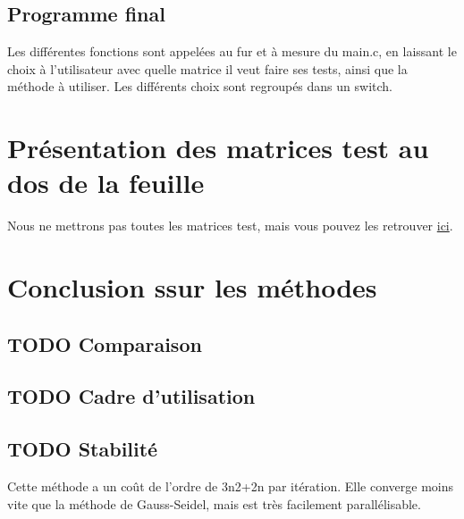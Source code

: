 \documentclass[letter]{article}
\begin{document}
\subsection{Programme final}
\label{sec:org2ace575}

Les différentes fonctions sont appelées au fur et à mesure du main.c, en laissant le choix à l'utilisateur avec quelle matrice il veut faire ses tests, ainsi que la méthode à utiliser. Les différents choix sont regroupés dans un switch.



\section{Présentation des matrices test au dos de la feuille}
\label{sec:org2186ad6}

Nous ne mettrons pas toutes les matrices test, mais vous pouvez les retrouver \href{matricetest.c}{ici}.





\section{Conclusion ssur les méthodes}
\label{sec:orgda48e3e}

\subsection{{\bfseries\sffamily TODO} Comparaison}
\label{sec:orga1fc223}

\subsection{{\bfseries\sffamily TODO} Cadre d'utilisation}
\label{sec:org5338251}

\subsection{{\bfseries\sffamily TODO} Stabilité}
\label{sec:orge2a490a}
Cette méthode a un coût de l'ordre de 3n2+2n par itération. Elle converge moins vite que la méthode de Gauss-Seidel, mais est très facilement parallélisable. 
\end{document}
